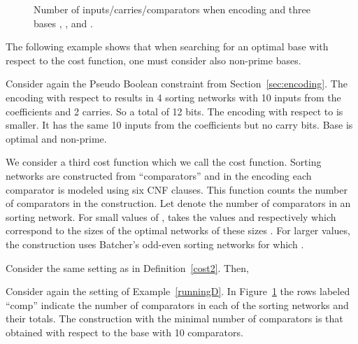 \documentclass[envcountsame]{llncs}
\begin{document}
\begin{figure}\vspace{-6ex}
  \begin{center}\scriptsize  

\end{center}
 \caption{Number of inputs/carries/comparators when encoding
    and three bases ,
   , and  .  }
\label{fig:3cost}
\vspace{-3ex}
\end{figure}

The following example shows that  when
searching for an optimal base with respect to the  cost
function, one must consider also non-prime bases.

\begin{example}
  Consider again the Pseudo Boolean constraint  from Section~\ref{sec:encoding}.
  The encoding with respect to  results in 4
  sorting networks with 10 inputs from the coefficients and 2
  carries. So a total of 12 bits. The encoding with respect to
   is smaller. It has the same 10 inputs from the
  coefficients but no carry bits. Base  is optimal and
  non-prime. 
\end{example}



We consider a third cost function which we call the 
cost function.
Sorting networks are constructed from ``comparators'' \cite{Knuth73}
and in the encoding each comparator is modeled using six CNF clauses.
This function counts the number of comparators in the construction.
Let  denote the number of comparators in an  sorting
network. For small values of ,  takes the values
 and  respectively which correspond to
the sizes of the optimal networks of these sizes \cite{Knuth73}.  For
larger values, the construction uses Batcher's odd-even sorting
networks \cite{Batcher68} for which
.



\begin{definition}
\label{num_comparators}
Consider the same setting as in Definition~\ref{cost2}.  Then,
\vspace{-7mm}

\end{definition}

\vspace{-5mm}
\begin{example}
  Consider again the setting of Example~\ref{runningD}. 
In Figure~\ref{fig:3cost}  the rows labeled ``comp'' indicate the
  number of  comparators in each of the sorting networks and their
  totals. The construction with the minimal number of comparators is
  that obtained with respect to the base  with 
  10 comparators.
\end{example}
\end{document}
